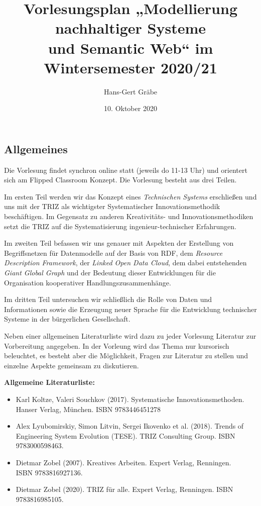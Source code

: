 \documentclass[11pt,a4paper]{article}
\title{Vorlesungsplan „Modellierung nachhaltiger Systeme\\ und Semantic Web“
  im Wintersemester 2020/21}
\author{Hans-Gert Gr\"abe}
\date{10. Oktober 2020}
\begin{document}
\maketitle
\subsection{Allgemeines}

Die Vorlesung findet synchron online statt (jeweils do 11-13 Uhr) und
orientert sich am Flipped Classroom Konzept. Die Vorlesung besteht aus drei
Teilen.

Im ersten Teil werden wir das Konzept eines \emph{Technischen Systems}
erschließen und uns mit der TRIZ als wichtigster Systematischer
Innovationsmethodik beschäftigen.  Im Gegensatz zu anderen Kreativitäts- und
Innovationsmethodiken setzt die TRIZ auf die Systematisierung
ingenieur-technischer Erfahrungen. 

Im zweiten Teil befassen wir uns genauer mit Aspekten der Erstellung von
Begriffsnetzen für Datenmodelle auf der Basis von RDF, dem \emph{Resource
  Description Framework}, der \emph{Linked Open Data Cloud}, dem dabei
entstehenden \emph{Giant Global Graph} und der Bedeutung dieser Entwicklungen
für die Organisation kooperativer Handlungszusammenhänge.

Im dritten Teil untersuchen wir schließlich die Rolle von Daten und
Informationen sowie die Erzeugung neuer Sprache für die Entwicklung
technischer Systeme in der bürgerlichen Gesellschaft. 

Neben einer allgemeinen Literaturliste wird dazu zu jeder Vorlesung Literatur
zur Vorbereitung angegeben. In der Vorleung wird das Thema nur kursorisch
beleuchtet, es besteht aber die Möglichkeit, Fragen zur Literatur zu stellen
und einzelne Aspekte gemeinsam zu diskutieren.

\textbf{Allgemeine Literaturliste:}
\begin{itemize}[noitemsep]
\item Karl Koltze, Valeri Souchkov (2017). Systematische Innovationsmethoden.
  Hanser Verlag, München. ISBN 9783446451278
\item Alex Lyubomirskiy, Simon Litvin, Sergei Ikovenko et al. (2018). Trends
  of Engineering System Evolution (TESE).  TRIZ Consulting Group. ISBN
  9783000598463.
\item Dietmar Zobel (2007). Kreatives Arbeiten. Expert Verlag, Renningen.\\
  ISBN 9783816927136.
\item Dietmar Zobel (2020). TRIZ für alle. Expert Verlag, Renningen. ISBN
  9783816985105.
\end{itemize}
\newpage
\tableofcontents
\newpage
\end{document}
